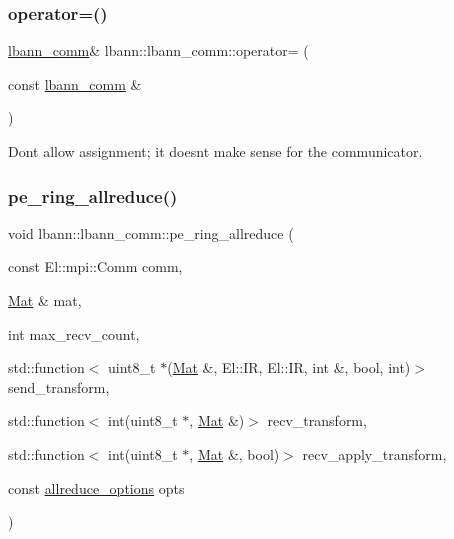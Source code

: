 \subsubsection{\texorpdfstring{operator=()}{operator=()}}
{\footnotesize\ttfamily \hyperlink{classlbann_1_1lbann__comm}{lbann\+\_\+comm}\& lbann\+::lbann\+\_\+comm\+::operator= (\begin{DoxyParamCaption}\item[{const \hyperlink{classlbann_1_1lbann__comm}{lbann\+\_\+comm} \&}]{ }\end{DoxyParamCaption})\hspace{0.3cm}{\ttfamily [delete]}}

Don\textquotesingle{}t allow assignment; it doesn\textquotesingle{}t make sense for the communicator. \mbox{\label{classlbann_1_1lbann__comm_ac294fe5fa47f283aba31fa1abfa99438}} 
\subsubsection{\texorpdfstring{pe\+\_\+ring\+\_\+allreduce()}{pe\_ring\_allreduce()}}
{\footnotesize\ttfamily void lbann\+::lbann\+\_\+comm\+::pe\+\_\+ring\+\_\+allreduce (\begin{DoxyParamCaption}\item[{const El\+::mpi\+::\+Comm}]{comm,  }\item[{\hyperlink{base_8hpp_a68f11fdc31b62516cb310831bbe54d73}{Mat} \&}]{mat,  }\item[{int}]{max\+\_\+recv\+\_\+count,  }\item[{std\+::function$<$ uint8\+\_\+t $\ast$(\hyperlink{base_8hpp_a68f11fdc31b62516cb310831bbe54d73}{Mat} \&, El\+::\+IR, El\+::\+IR, int \&, bool, int)$>$}]{send\+\_\+transform,  }\item[{std\+::function$<$ int(uint8\+\_\+t $\ast$, \hyperlink{base_8hpp_a68f11fdc31b62516cb310831bbe54d73}{Mat} \&)$>$}]{recv\+\_\+transform,  }\item[{std\+::function$<$ int(uint8\+\_\+t $\ast$, \hyperlink{base_8hpp_a68f11fdc31b62516cb310831bbe54d73}{Mat} \&, bool)$>$}]{recv\+\_\+apply\+\_\+transform,  }\item[{const \hyperlink{structlbann_1_1lbann__comm_1_1allreduce__options}{allreduce\+\_\+options}}]{opts }\end{DoxyParamCaption})}

